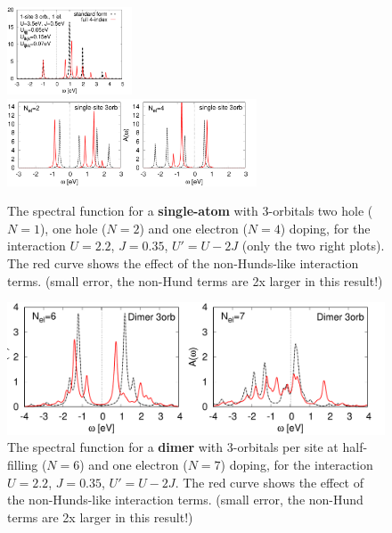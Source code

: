 \documentclass[12pt,a4paper]{scrartcl}
\numberwithin{equation}{section}
\begin{document}
\begin{figure}[h]
\includegraphics[width=0.33\textwidth]{figs/nonHund/3orb_1el.pdf}
 \includegraphics[width=0.66\textwidth]{figs/nonHund/3orb_gf_doping.pdf}
 \caption{The spectral function for a \textbf{single-atom} with 3-orbitals two hole ($N=1$), one hole ($N=2$)  and 
 one electron ($N=4$) doping, for the interaction $U=2.2$, $J=0.35$, $U'=U-2J$ (only the two right plots). The red curve shows the effect of the non-Hunds-like interaction terms.
 (small error, the non-Hund terms are 2x larger in this result!)}
\end{figure}

\begin{figure}[h]
 \includegraphics[width=1.0\textwidth]{figs/nonHund/3orbdimer.pdf}
 \caption{The spectral function for a \textbf{dimer} with 3-orbitals per site at half-filling ($N=6$) and 
 one electron ($N=7$) doping, for the interaction $U=2.2$, $J=0.35$, $U'=U-2J$. The red curve shows the effect of the non-Hunds-like interaction terms.
 (small error, the non-Hund terms are 2x larger in this result!)}
\end{figure}

\end{document}
